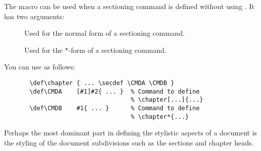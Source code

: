  \DescribeMacro{\secdef}
    The macro  can be used when a sectioning command is
    defined without using . It has two arguments:


    \begin{description}
    \item[] Used for the normal form of a
          sectioning command.
    \item[] Used for the $*$-form of a
          sectioning command.
    \end{description}

    You can use  as follows:
 \begin{verbatim}
       \def\chapter { ... \secdef \CMDA \CMDB }
       \def\CMDA    [#1]#2{ ... }  % Command to define
                                   % \chapter[...]{...}
       \def\CMDB    #1{ ... }      % Command to define
                                   % \chapter*{...}
 \end{verbatim}


Perhaps the most dominant part in defining the stylistic aspects of a document is the styling of the document subdivisions such as the sections and chapter heads.



